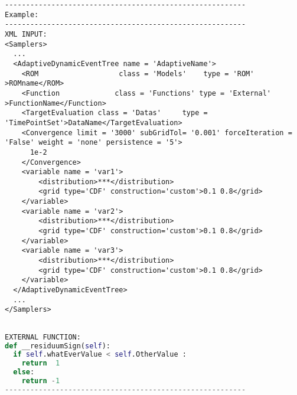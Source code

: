 \begin{lstlisting}[style=XML]
---------------------------------------------------------
Example:
---------------------------------------------------------
XML INPUT:
<Samplers>
  ...
  <AdaptiveDynamicEventTree name = 'AdaptiveName'>
    <ROM                   class = 'Models'    type = 'ROM'            >ROMname</ROM>
    <Function             class = 'Functions' type = 'External'      >FunctionName</Function>
    <TargetEvaluation class = 'Datas'     type = 'TimePointSet'>DataName</TargetEvaluation>
    <Convergence limit = '3000' subGridTol= '0.001' forceIteration = 'False' weight = 'none' persistence = '5'>
      1e-2
    </Convergence>
    <variable name = 'var1'>
        <distribution>***</distribution>
        <grid type='CDF' construction='custom'>0.1 0.8</grid>
    </variable>
    <variable name = 'var2'>
        <distribution>***</distribution>
        <grid type='CDF' construction='custom'>0.1 0.8</grid>
    </variable>
    <variable name = 'var3'>
        <distribution>***</distribution>
        <grid type='CDF' construction='custom'>0.1 0.8</grid>
    </variable>
  </AdaptiveDynamicEventTree>
  ...
</Samplers>
\end{lstlisting} 
\begin{lstlisting}[language=python]

EXTERNAL FUNCTION:
def __residuumSign(self):
  if self.whatEverValue < self.OtherValue : 
    return  1
  else: 
    return -1
---------------------------------------------------------
\end{lstlisting} 

























